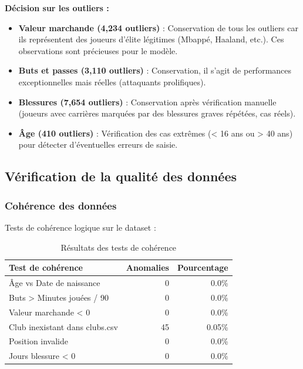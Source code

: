 \documentclass[12pt,a4paper]{article}
\begin{document}
\textbf{Décision sur les outliers :}

\begin{itemize}[leftmargin=*]
    \item \textbf{Valeur marchande (4,234 outliers)} : Conservation de tous les outliers car ils représentent des joueurs d'élite légitimes (Mbappé, Haaland, etc.). Ces observations sont précieuses pour le modèle.
    
    \item \textbf{Buts et passes (3,110 outliers)} : Conservation, il s'agit de performances exceptionnelles mais réelles (attaquants prolifiques).
    
    \item \textbf{Blessures (7,654 outliers)} : Conservation après vérification manuelle (joueurs avec carrières marquées par des blessures graves répétées, cas réels).
    
    \item \textbf{Âge (410 outliers)} : Vérification des cas extrêmes (< 16 ans ou > 40 ans) pour détecter d'éventuelles erreurs de saisie.
\end{itemize}

\newpage

\subsection{Vérification de la qualité des données}

\subsubsection{Cohérence des données}

Tests de cohérence logique sur le dataset :

\begin{table}[h]
\centering
\begin{tabular}{@{}lrr@{}}
\toprule
\textbf{Test de cohérence} & \textbf{Anomalies} & \textbf{Pourcentage} \\ \midrule
Âge vs Date de naissance & 0 & 0.0\% \\
Buts > Minutes jouées / 90 & 0 & 0.0\% \\
Valeur marchande < 0 & 0 & 0.0\% \\
Club inexistant dans clubs.csv & 45 & 0.05\% \\
Position invalide & 0 & 0.0\% \\
Jours blessure < 0 & 0 & 0.0\% \\ \bottomrule
\end{tabular}
\caption{Résultats des tests de cohérence}
\end{table}
\end{document}
